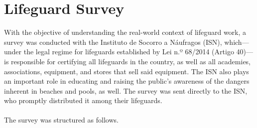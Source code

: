 \section{Lifeguard Survey}
\label{}
With the objective of understanding the real-world context of lifeguard work, a survey was conducted with the Instituto de Socorro a Náufragos (ISN), which—under the legal regime for lifeguards established by Lei n.º 68/2014 (Artigo 40)\parencite{lei68}—is responsible for certifying all lifeguards in the country, as well as all academies, associations, equipment, and stores that sell said equipment. The ISN also plays an important role in educating and raising the public's awareness of the dangers inherent in beaches and pools, as well.
The survey was sent directly to the ISN, who promptly distributed it among their lifeguards.
\\
\\
The survey was structured as follows.
